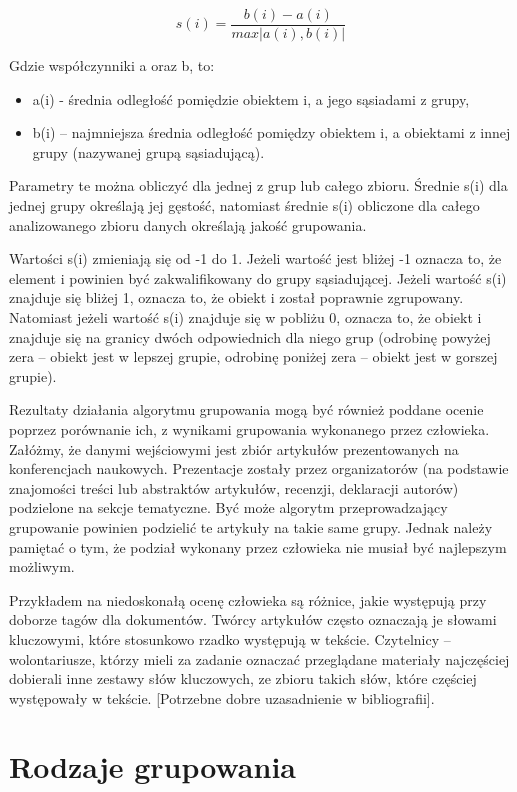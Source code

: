 \documentclass{article}
\begin{document}
\[s(i) = \frac{b(i) - a(i)}{max|a(i),b(i)|}\]

Gdzie współczynniki a oraz b, to:

\begin{itemize}
	\item a(i) - średnia odległość pomiędzie obiektem i, a jego sąsiadami z grupy,
	\item b(i) – najmniejsza średnia odległość pomiędzy obiektem i, a obiektami z innej grupy (nazywanej grupą sąsiadującą).
\end{itemize}
Parametry te można obliczyć dla jednej z grup lub całego zbioru. Średnie s(i)  dla jednej grupy określają jej gęstość, natomiast średnie s(i) obliczone dla całego analizowanego zbioru danych określają jakość grupowania.

Wartości s(i) zmieniają się od -1 do 1. Jeżeli wartość jest bliżej -1 oznacza to, że element i powinien być zakwalifikowany do grupy sąsiadującej. Jeżeli wartość s(i) znajduje się bliżej 1, oznacza to, że obiekt i został poprawnie zgrupowany. Natomiast jeżeli wartość s(i) znajduje się w pobliżu  0, oznacza to, że obiekt i znajduje się na granicy dwóch odpowiednich dla niego grup (odrobinę powyżej zera – obiekt jest w lepszej grupie, odrobinę poniżej zera – obiekt jest w gorszej grupie).

Rezultaty działania algorytmu grupowania mogą być również poddane ocenie poprzez porównanie ich, z wynikami grupowania wykonanego przez człowieka. Załóżmy, że danymi wejściowymi jest zbiór artykułów prezentowanych na konferencjach naukowych. Prezentacje zostały przez organizatorów (na podstawie znajomości treści lub abstraktów artykułów, recenzji, deklaracji autorów) podzielone na sekcje tematyczne. Być może algorytm przeprowadzający grupowanie powinien podzielić te artykuły na takie same grupy. Jednak należy pamiętać o tym, że podział wykonany przez człowieka nie musiał być najlepszym możliwym. 

Przykładem na niedoskonałą ocenę człowieka są różnice, jakie występują przy doborze tagów dla dokumentów. Twórcy artykułów często oznaczają je słowami kluczowymi, które stosunkowo rzadko występują w tekście. Czytelnicy – wolontariusze, którzy mieli za zadanie oznaczać przeglądane materiały najczęściej dobierali inne zestawy słów kluczowych, ze zbioru takich słów, które częściej występowały w tekście. [Potrzebne dobre uzasadnienie w bibliografii].

\newpage
\section{Rodzaje grupowania}
\end{document}
